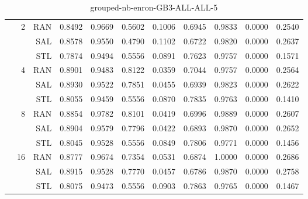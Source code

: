 \begin{center}
\begin{table}[htbp]
\begin{center}
\begin{tabular}{ | r | r | r | r | r | r | r | r | r | r | r |}
 & \multirow{3}{*}{2} & RAN & 0.8492 & 0.9669 & 0.5602 & 0.1006 & 0.6945 & 0.9833 & 0.0000 & 0.2540\\ \cline{3-11}
 &   & SAL & 0.8578 & 0.9550 & 0.4790 & 0.1102 & 0.6722 & 0.9820 & 0.0000 & 0.2637\\ \cline{3-11}
 &   & STL & 0.7874 & 0.9494 & 0.5556 & 0.0891 & 0.7623 & 0.9757 & 0.0000 & 0.1571\\ \cline{2-11}
 & \multirow{3}{*}{4} & RAN & 0.8901 & 0.9483 & 0.8122 & 0.0359 & 0.7044 & 0.9757 & 0.0000 & 0.2564\\ \cline{3-11}
 &   & SAL & 0.8930 & 0.9522 & 0.7851 & 0.0455 & 0.6939 & 0.9823 & 0.0000 & 0.2622\\ \cline{3-11}
 &   & STL & 0.8055 & 0.9459 & 0.5556 & 0.0870 & 0.7835 & 0.9763 & 0.0000 & 0.1410\\ \cline{2-11}
 & \multirow{3}{*}{8} & RAN & 0.8854 & 0.9782 & 0.8101 & 0.0419 & 0.6996 & 0.9889 & 0.0000 & 0.2607\\ \cline{3-11}
 &   & SAL & 0.8904 & 0.9579 & 0.7796 & 0.0422 & 0.6893 & 0.9870 & 0.0000 & 0.2652\\ \cline{3-11}
 &   & STL & 0.8045 & 0.9528 & 0.5556 & 0.0849 & 0.7806 & 0.9771 & 0.0000 & 0.1456\\ \cline{2-11}
 & \multirow{3}{*}{16} & RAN & 0.8777 & 0.9674 & 0.7354 & 0.0531 & 0.6874 & 1.0000 & 0.0000 & 0.2686\\ \cline{3-11}
 &   & SAL & 0.8915 & 0.9528 & 0.7770 & 0.0457 & 0.6786 & 0.9870 & 0.0000 & 0.2758\\ \cline{3-11}
 &   & STL & 0.8075 & 0.9473 & 0.5556 & 0.0903 & 0.7863 & 0.9765 & 0.0000 & 0.1467\\ \cline{2-11}
\hline
\end{tabular}
\caption{grouped-nb-enron-GB3-ALL-ALL-5}
\end{center}
 \end{table}
\end{center}

